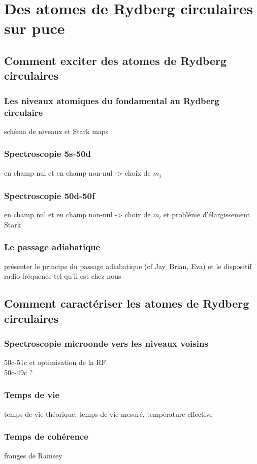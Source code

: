 \chapter{Des atomes de Rydberg circulaires sur puce}
\label{chapter:50c}

\section{Comment exciter des atomes de Rydberg circulaires}
	\subsection{Les niveaux atomiques du fondamental au Rydberg circulaire}
		\noindent schéma de niveaux et Stark maps
	\subsection{Spectroscopie 5s-50d}
		\noindent en champ nul et en champ non-nul -> choix de $m_j$
	\subsection{Spectroscopie 50d-50f}
		\noindent en champ nul et en champ non-nul -> choix de $m_l$ et problème d'élargissement Stark
	\subsection*{Le passage adiabatique}
		\noindent présenter le principe du passage adiabatique (cf Jay, Brian, Eva) et le dispositif radio-fréquence tel qu'il est chez nous

\section{Comment caractériser les atomes de Rydberg circulaires}
	\subsection{Spectroscopie microonde vers les niveaux voisins}
		\noindent 50c-51c et optimisation de la RF\\
		\noindent 50c-49c ?
	\subsection{Temps de vie}
		\noindent temps de vie théorique, temps de vie mesuré, température effective
	\subsection{Temps de cohérence}
		\noindent franges de Ramsey
	

